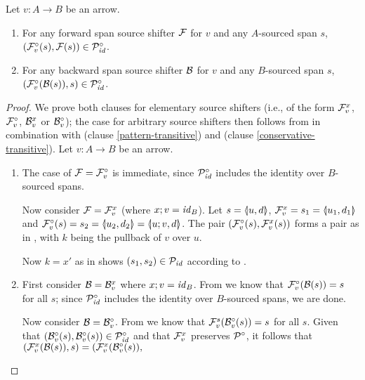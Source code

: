 \begin{lemma}
Let $v:A\to B$ be an arrow.
\begin{enumerate}[topsep=\smallskipamount]
\item For any forward span source shifter $\cF$ for $v$ and any $A$-sourced span $s$, $(\dF v(s),\cF(s))\in \ccP_\id$.
\item For any backward span source shifter $\cB$ for $v$ and any $B$-sourced span $s$, $(\dF v(\cB(s)),s)\in \ccP_\id$.
\end{enumerate}
\end{lemma}
%
\begin{proof}
We prove both clauses for elementary source shifters (i.e., of the form $\rF v x$, $\dF v$, $\rB v x$ or $\dB v$); the case for arbitrary source shifters then follows from  in combination with  (clause \ref{pattern-transitive}) and  (clause \ref{conservative-transitive}). Let $v:A\to B$ be an arrow.
\begin{enumerate}[topsep=\smallskipamount]
\item The case of $\cF=\dF v$ is immediate, since $\ccP_\id$ includes the identity over $B$-sourced spans.

Now consider $\cF=\rF v x$ (where $x;v=\id_B$). Let $s=\spanof u d$, $\rF v x=s_1=\spanof{u_1}{d_1}$ and $\dF v(s)=s_2=\spanof{u_2}{d_2}=\spanof{u;v}{d}$. The pair $(\dF v(s),\rF v x(s))$ forms a pair as in , with $k$ being the pullback of $v$ over $u$.

Now $k=x'$ as in  shows $(s_1,s_2)\in \cP_\id$ according to .

\item First consider $\cB=\rB v x$ where $x;v=\id_B$. From  we know that $\dF v(\cB(s))=s$ for all $s$; since $\ccP_\id$ includes the identity over $B$-sourced spans, we are done.

Now consider $\cB=\dB v$. From  we know that $\rF v s(\dB v(s))=s$ for all $s$. Given that $(\dB v(s),\dB v(s))\in \ccP_\id$ and that $\rF v x$ preserves $\ccP$, it follows that $(\rF v x(\cB(s)),s)=(\rF v x(\dB v(s)),$



\end{enumerate}
\end{proof}
